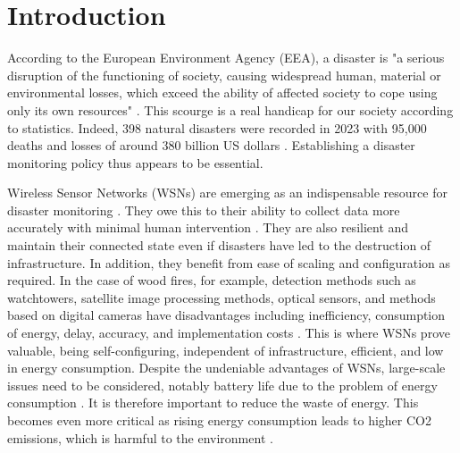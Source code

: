 \section{Introduction}
% 
% 
% 
% 
According to the European Environment Agency (EEA), a disaster is "a serious disruption of the functioning of society, causing widespread human, material or environmental losses, which exceed the ability of affected society to cope using only its own resources" \cite{noauthor_disaster_nodate}. This scourge is a real handicap for our society according to statistics. Indeed, 398 natural disasters were recorded in 2023  with 95,000 deaths and losses of around 380 billion US dollars \cite{burgueno_salas_global_nodate} \cite{noauthor_number_nodate}. Establishing a disaster monitoring policy thus appears to be essential. 

Wireless Sensor Networks (WSNs) are emerging as an indispensable resource for disaster monitoring \cite{al_qundus_wireless_2020}. They owe this to their ability to collect data more accurately with minimal human intervention \cite{bhatt_wireless_2021-1}. They are also resilient and maintain their connected state even if disasters have led to the destruction of infrastructure. In addition, they benefit from ease of scaling and configuration as required. In the case of wood fires, for example, detection methods such as watchtowers, satellite image processing methods, optical sensors, and methods based on digital cameras have disadvantages including inefficiency, consumption of energy, delay, accuracy, and implementation costs \cite{dampage_forest_2022-1}. This is where WSNs prove valuable, being self-configuring, independent of infrastructure, efficient, and low in energy consumption. Despite the undeniable advantages of WSNs, large-scale issues need to be considered, notably battery life due to the problem of energy consumption \cite{yarali_wireless_2020}. It is therefore important to reduce the waste of energy. This becomes even more critical as rising energy consumption leads to higher CO2 emissions, which is harmful to the environment \cite{thakare_study_2017}. 

